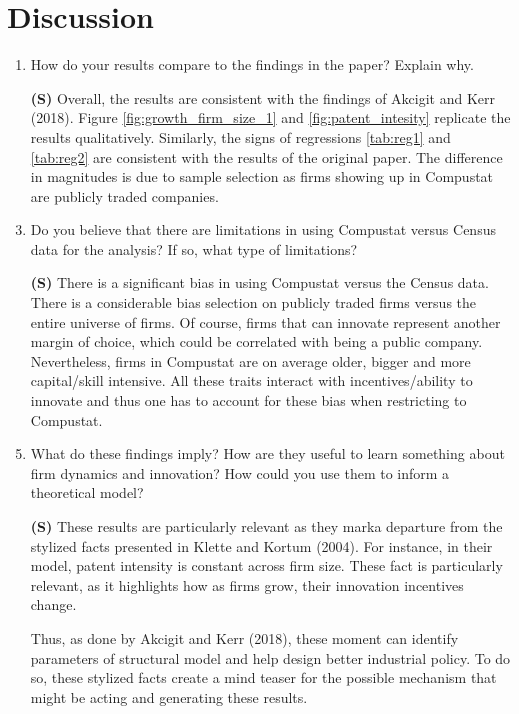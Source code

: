 \documentclass[12pt]{article}
\begin{document}
\FloatBarrier

\section{Discussion}

\begin{enumerate}[leftmargin=0pt, label=\textbf{(\alph*)}]

\item How do your results compare to the findings in the paper? Explain why.
\item[\textbf{(S)}] Overall, the results are consistent with the findings of Akcigit and Kerr (2018). Figure \ref{fig:growth_firm_size_1} and \ref{fig:patent_intesity} replicate the results qualitatively. Similarly, the signs of regressions \ref{tab:reg1} and \ref{tab:reg2} are consistent with the  results of the original paper. The difference in magnitudes is due to sample selection as firms showing up in Compustat are publicly traded companies. 

\item Do you believe that there are limitations in using Compustat versus Census data for the analysis? If so, what type of limitations?
\item[\textbf{(S)}] There is a significant bias in using Compustat versus the Census data. There is a considerable bias selection on publicly traded firms versus the entire universe of firms. Of course, firms that can innovate represent another margin of choice, which could be correlated with being a public company. Nevertheless, firms in Compustat are on average older, bigger and more capital/skill intensive. All these traits interact with incentives/ability to innovate and thus one has to account for these bias when restricting to Compustat.  

\item What do these findings imply? How are they useful to learn something about firm dynamics and innovation? How could you use them to inform a theoretical model?
\item[\textbf{(S)}] These results are particularly relevant as they marka departure from the stylized facts presented in Klette and Kortum (2004). For instance, in their model, patent intensity is constant across firm size. These fact is particularly relevant, as it highlights how as firms grow, their innovation incentives change. 

Thus, as done by Akcigit and Kerr (2018), these moment can identify parameters of structural model and help design better industrial policy. To do so, these stylized facts create a mind teaser for the possible mechanism that might be acting and generating these results. 

\end{enumerate}
\end{document}
